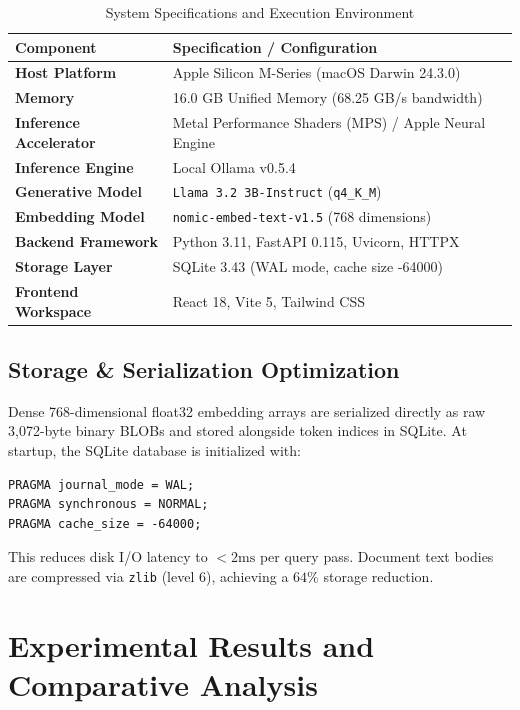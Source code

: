 \begin{table}[htbp]
\centering
\caption{System Specifications and Execution Environment}
\label{tab:hardware}
\small
\begin{tabularx}{\columnwidth}{lX}
\toprule
\textbf{Component} & \textbf{Specification / Configuration} \\
\midrule
\textbf{Host Platform} & Apple Silicon M-Series (macOS Darwin 24.3.0) \\
\textbf{Memory} & 16.0 GB Unified Memory (68.25 GB/s bandwidth) \\
\textbf{Inference Accelerator} & Metal Performance Shaders (MPS) / Apple Neural Engine \\
\textbf{Inference Engine} & Local Ollama v0.5.4 \\
\textbf{Generative Model} & \texttt{Llama 3.2 3B-Instruct} (\texttt{q4\_K\_M}) \\
\textbf{Embedding Model} & \texttt{nomic-embed-text-v1.5} (768 dimensions) \\
\textbf{Backend Framework} & Python 3.11, FastAPI 0.115, Uvicorn, HTTPX \\
\textbf{Storage Layer} & SQLite 3.43 (WAL mode, cache size -64000) \\
\textbf{Frontend Workspace} & React 18, Vite 5, Tailwind CSS \\
\bottomrule
\end{tabularx}
\end{table}

\subsection{Storage & Serialization Optimization}
Dense 768-dimensional float32 embedding arrays are serialized directly as raw 3,072-byte binary BLOBs and stored alongside token indices in SQLite. At startup, the SQLite database is initialized with:
\begin{verbatim}
PRAGMA journal_mode = WAL;
PRAGMA synchronous = NORMAL;
PRAGMA cache_size = -64000;
\end{verbatim}
This reduces disk I/O latency to $<2\text{ms}$ per query pass. Document text bodies are compressed via \texttt{zlib} (level 6), achieving a $64\%$ storage reduction.

\section{Experimental Results and Comparative Analysis}
\label{sec:results}

